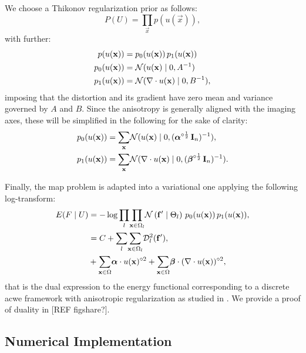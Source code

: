 We choose a Thikonov regularization prior as follows:
  \begin{equation*}
  P(U) = \underset{\vec{x}}{\prod} p(u(\vec{x})),
  \end{equation*}
  with further:
  \begin{align*}
  p(u(\vec{x})) &= p_0(u(\vec{x})) \, p_1(u(\vec{x})) \notag\\
  p_0(u(\vec{x})) &= \mathcal{N}( u(\vec{x}) \mid 0, A^{-1}) \notag\\
  p_1(u(\vec{x})) &= \mathcal{N}(  \nabla \cdot u(\vec{x}) \mid 0, B^{-1}),
  \end{align*}
  imposing that the distortion and its gradient have zero
  mean and variance governed by $A$ and $B$.
Since the anisotropy is generally aligned with the imaging axes, these will be simplified
  in the following for the sake of clarity:
  \begin{align}
    p_0(u(\vec{x})) &= \underset{\vec{x}}{\sum} \mathcal{N}( u(\vec{x}) \mid 0,
      (\boldsymbol{\alpha}^{\circ\frac12}\,\vec{I}_n)^{-1}), \notag\\
    p_1(u(\vec{x})) &= \underset{\vec{x}}{\sum} \mathcal{N}( \nabla \cdot u(\vec{x}) \mid 0,
      (\boldsymbol{\beta}^{\circ\frac12}\,\vec{I}_n)^{-1}).
  \label{eq:priors}
  \end{align}

Finally, the \gls{map} problem is adapted into a variational one applying the
  following log-transform:
  \begin{align}
  E(F \mid U) &= -\log \underset{l}{\prod}
  \underset{\vec{x} \in \Omega_l}{\prod}
  \mathcal{N} \left( \vec{f}' \mid \Theta_l \right)\,p_0( u(\vec{x}))\,p_1( u(\vec{x})), \notag\\
  &= C + \underset{l}{\sum}
  \underset{\vec{x} \in \Omega_l}{\sum}
  \mdist{f'}{l}, \notag\\
  &+ \underset{\vec{x} \in \Omega}{\sum} \boldsymbol{\alpha} \cdot u(\vec{x})^{\circ2}
  + \underset{\vec{x} \in \Omega}{\sum} \boldsymbol{\beta} \cdot (\nabla \cdot u(\vec{x}))^{\circ2},
  \label{eq:energy}
  \end{align}
  that is the dual expression to the energy functional corresponding
  to a discrete \gls*{acwe} framework \citep{chan_active_2001}
  with anisotropic regularization as studied in
  \citep{nagel_investigation_1986}.
We provide a proof of duality in {\color{red} [REF figshare?]}.


\subsection{Numerical Implementation}
\label{sec:numerical_implementation}

